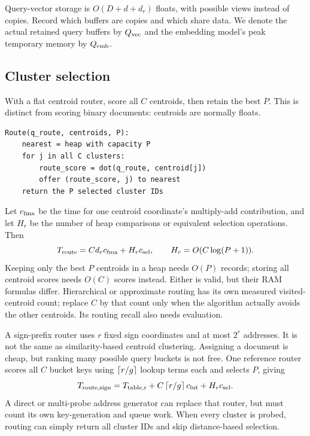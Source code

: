 Query-vector storage is $O(D+d+d_r)$ floats, with possible views instead of copies. Record which buffers are copies and which share data. We denote the actual retained query buffers by $Q_{\rm vec}$ and the
embedding model's peak temporary memory by $Q_{\rm emb}$.

\subsection{Cluster selection}
With a flat centroid router, score all $C$ centroids, then retain the best $P$. This is distinct
from scoring binary documents: centroids are normally floats.
\par\noindent\begin{minipage}{\linewidth}
\begin{lstlisting}[caption={A simple flat centroid router with bounded selection memory.}]
Route(q_route, centroids, P):
    nearest = heap with capacity P
    for j in all C clusters:
        route_score = dot(q_route, centroid[j])
        offer (route_score, j) to nearest
    return the P selected cluster IDs
\end{lstlisting}
\end{minipage}\par
Let $c_{\rm fma}$ be the time for one centroid coordinate's multiply-add contribution, and let
$H_r$ be the number of heap comparisons or equivalent selection operations. Then
\begin{equation}
T_{\rm route}=C d_r c_{\rm fma}+H_r c_{\rm sel},\qquad
H_r=O(C\log(P+1)).
\label{eq:route}
\end{equation}
Keeping only the best $P$ centroids in a heap needs $O(P)$ records; storing all centroid scores needs $O(C)$ scores
instead. Either is valid, but their RAM formulas differ. Hierarchical or approximate routing
has its own measured visited-centroid count; replace $C$ by that count only when the algorithm
actually avoids the other centroids. Its routing recall also needs evaluation.

A sign-prefix router uses $r$ fixed sign coordinates and at most $2^r$ addresses. It is not the
same as similarity-based centroid clustering. Assigning a document is cheap, but ranking many
possible query buckets is not free. One reference router scores all $C$ bucket keys using
$\left\lceil r/g\right\rceil$ lookup terms each and selects $P$, giving
\[
T_{\rm route,sign}=T_{\rm table,r}+C\left\lceil r/g\right\rceil c_{\rm lut}+H_r c_{\rm sel}.
\]
A direct or multi-probe address generator can replace that router, but must count its own
key-generation and queue work. When every cluster is probed, routing can simply return all
cluster IDs and skip distance-based selection.

